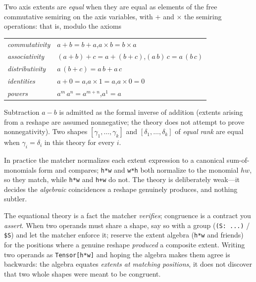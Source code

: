 \begin{definition}
\label{def:b-dimexpr}
Two axis extents are \emph{equal} when they are equal as elements of the free
commutative semiring on the axis variables, with $+$ and $\times$ the semiring
operations: that is, modulo the axioms

\begin{center}
\begin{tabular}{@{}ll@{}}
\toprule
\emph{commutativity} & $a + b = b + a$,\qquad $a \times b = b \times a$ \\
\emph{associativity} & $(a+b)+c = a+(b+c)$,\qquad $(a\,b)\,c = a\,(b\,c)$ \\
\emph{distributivity} & $a\,(b+c) = a\,b + a\,c$ \\
\emph{identities} & $a + 0 = a$,\qquad $a \times 1 = a$,\qquad $a \times 0 = 0$ \\
\emph{powers} & $a^{m}\,a^{n} = a^{m+n}$,\qquad $a^{1}=a$ \\
\bottomrule
\end{tabular}
\end{center}

\noindent Subtraction $a - b$ is admitted as the formal inverse of addition
(extents arising from a reshape are assumed nonnegative; the theory does not
attempt to prove nonnegativity). Two shapes $[\gamma_1,\dots,\gamma_k]$ and
$[\delta_1,\dots,\delta_k]$ of \emph{equal rank} are equal when $\gamma_i = \delta_i$
in this theory for every $i$.
\end{definition}

In practice the matcher normalizes each extent expression to a canonical
sum-of-monomials form and compares; \lstinline[style=l4style]|h*w| and
\lstinline[style=l4style]|w*h| both normalize to the monomial $hw$, so they match,
while \lstinline[style=l4style]|h*w| and \lstinline[style=l4style]|h+w| do not.
The theory is deliberately weak---it decides the \emph{algebraic} coincidences a
reshape genuinely produces, and nothing subtler.

\begin{notationbox}
The equational theory is a fact the matcher \emph{verifies}; congruence is a
contract you \emph{assert}. When two operands must share a shape, say so with a
group (\lstinline[style=l4style]|(S: ...)| / \lstinline[style=l4style]|$S|) and let
the matcher enforce it; reserve the extent algebra
(\lstinline[style=l4style]|h*w| and friends) for the positions where a genuine
reshape \emph{produced} a composite extent. Writing two operands as
\lstinline[style=l4style]|Tensor[h*w]| and hoping the algebra makes them agree is
backwards: the algebra equates \emph{extents at matching positions}, it does not
discover that two whole shapes were meant to be congruent.
\end{notationbox}

